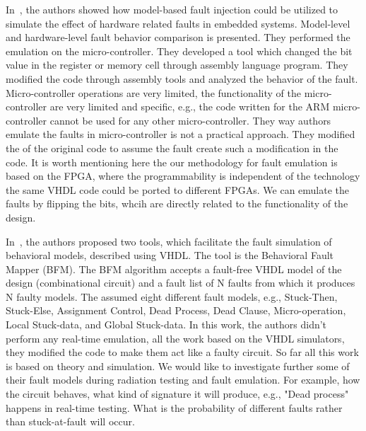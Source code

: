 \label{faultmodels}


In~\citep{svenningsson2010model}, the authors showed how model-based fault injection could be utilized to
simulate the effect of hardware related faults in embedded systems. Model-level and hardware-level
fault behavior comparison is presented. They performed the emulation on the micro-controller. They developed a tool which changed the bit value in the register or memory cell through assembly language program. They modified the code through assembly tools and analyzed the behavior of the fault. Micro-controller operations are very limited, the functionality of the micro-controller are very limited and specific, e.g., the code written for the ARM micro-controller cannot be used for any other micro-controller. They way authors emulate the faults in micro-controller is not a practical approach. They modified the  of the original code to assume the fault create such a modification in the code. It is worth mentioning here the our methodology for fault emulation is based on the FPGA, where the programmability is independent of the technology the same VHDL code could be ported to different FPGAs. We can emulate the faults by flipping the bits, whcih are directly related to the functionality of the design.




In~\citep{hayne1999behavioral}, the authors proposed two tools, which facilitate the fault simulation of behavioral
models, described using VHDL. The tool is the Behavioral Fault Mapper (BFM). The BFM algorithm
accepts a fault-free VHDL model of the design (combinational circuit) and a fault list of N faults from
which it produces N faulty models. The assumed eight different fault models, e.g., Stuck-Then, Stuck-Else,
Assignment Control, Dead Process, Dead Clause, Micro-operation, Local Stuck-data, and Global Stuck-data.  In this work, the authors didn't perform any real-time emulation, all the work based on the VHDL simulators, they modified the code to make them act like a  faulty circuit. So far all this work is based on theory and simulation. We would like to investigate further some of their fault models during radiation testing and fault emulation. For example, how the circuit behaves, what kind of signature it will produce, e.g.,  "Dead process" happens in real-time testing.  What is the probability of different faults rather than stuck-at-fault will occur.




